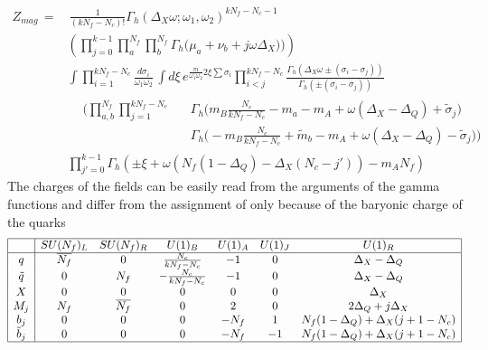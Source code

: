 \begin{equation}
\begin{aligned}
Z_{mag} %
\,= & \, \frac{1}{(k N_f - N_c)!}
 \Gamma_h ( \Delta_X \omega ; \omega_1 , \omega_2)^{ k N_f - N_c -1}  \\
 &  \left( \prod_{j=0}^{k-1}
\prod_a^{N_f } \prod_b^{N_f}  \Gamma_h \big( \mu_a+  \nu_b + j \omega \Delta_X) \big)  \right) \\
&\int  \prod_{i=1}^{ k N_f - N_c } \frac{d \sigma_i }{ \omega_1 \omega_2} \,\int
d \xi \, e^{ \frac{\pi i }{ \omega_1 \omega_2} 2 \xi  \sum \sigma_i }  
\prod_{i<j}^{k N_f - N_c } \frac{ \Gamma_h( \Delta_X \omega \pm (\sigma_i - \sigma_j)) }{ \Gamma_h ( \pm (\sigma_i - \sigma_j) )}
	\\&
\begin{aligned}
	 &  \bigg( \prod_{a,b}^{N_f} \prod_{j=1}^{k N_f - N_c }
	 && \Gamma_h \big( m_B \frac{N_c}{ k N_f-N_c} - m_a - m_A + \omega (\Delta_X - \Delta_Q)  + \tilde{\sigma}_j \big) \\
 & && \Gamma_h \big(  -m_B \frac{N_c}{k N_f-N_c} + \tilde{m}_b - m_A + \omega (\Delta_X - \Delta_Q)  - \tilde{\sigma}_j \big)  \bigg)
	\end{aligned}
	\\
	& \prod_{j'=0}^{k-1} \Gamma_h \left( \pm {\xi} +\omega \left(
	N_f ( 1 - \Delta_Q ) - \Delta_X ( N_c - j')  \right) - m_A N_f
 \right)
\end{aligned}
\end{equation}
The charges of the fields can be easily read from the arguments of the gamma functions and differ from the assignment of \cite{Nii:2014jsa} only because of the baryonic charge of the quarks
\begin{equation}
\begin{array}{|c |c c c c c c |}
\hline
 & SU(N_f)_L & SU(N_f)_R & U(1)_B & U(1)_A & U(1)_J & U(1)_R  \\
\hline
q & \overline{N_f} & 0  & \frac{N_c}{k N_f - N_c}  & -1  & 0  & \Delta_X - \Delta_Q \\
\tilde{q}   & 0  &N_f & -\frac{N_c}{k N_f - N_c} & - 1  & 0 &\Delta_X - \Delta_Q \\
X & 0 & 0 & 0 & 0 &0 & \Delta_X \\
M_j  & N_f & \overline{N_f} & 0 & 2 & 0 & 2 \Delta_Q + j \Delta_X\\
b_j & 0  & 0 & 0  &   -N_f &  1   & N_f ( 1 - \Delta_Q) + \Delta_X (j +1  - N_c)  \\
 \tilde{b} _j & 0  & 0 & 0  &   - N_f &  -1   & N_f ( 1 - \Delta_Q) + \Delta_X (j +1 - N_c)  \\
\hline
\end{array}
\end{equation}
